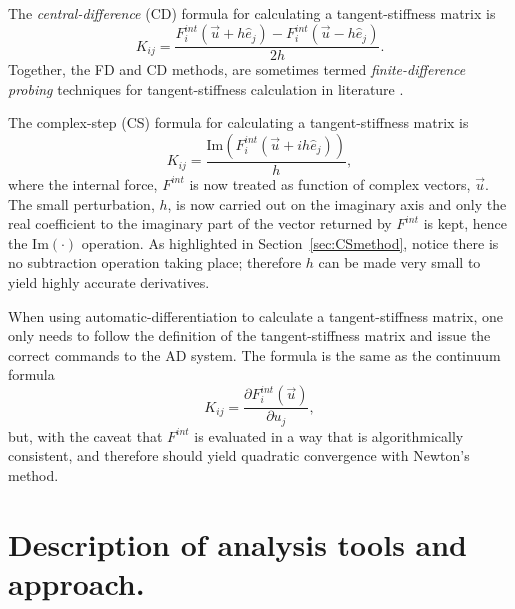 \documentclass[preprint,12pt]{elsarticle}
\begin{document}
The \emph{central-difference} (CD) formula for calculating a tangent-stiffness matrix is
%
\begin{equation} 
  K_{ij} = \frac{F_i^{int}(\vec{u} + h \hat{e}_j) - F_i^{int}(\vec{u} - h \hat{e}_j)}{2 h}.
\end{equation}
%
Together, the FD and CD methods, are sometimes termed \emph{finite-difference probing} techniques for tangent-stiffness calculation in literature \cite{ref-Adaggio}.

The complex-step (CS) formula for calculating a tangent-stiffness matrix is
%
\begin{equation} 
  K_{ij} = \frac{\mbox{Im}(F_i^{int}(\vec{u} + i h \hat{e}_j))}{h},
\end{equation}
%
where the internal force, $F^{int}$ is now treated as function of complex vectors,  $\vec{u}$. The small perturbation, $h$, is now carried out on the imaginary axis and only the real coefficient to the imaginary part of the vector returned by $F^{int}$ is kept, hence the $\mbox{Im}(\cdot)$ operation. As highlighted in Section~\ref{sec:CSmethod}, notice there is no subtraction operation taking place; therefore $h$ can be made very small to yield highly accurate derivatives.

When using automatic-differentiation to calculate a tangent-stiffness matrix, one only needs to follow the definition of the tangent-stiffness matrix and issue the correct commands to the AD system. The formula is the same as the continuum formula
%
\begin{equation} 
  K_{ij} = \frac{\partial F_i^{int}(\vec{u})}{\partial u_j},
\end{equation}
%
but, with the caveat that $F^{int}$ is evaluated in a way that is algorithmically consistent, and therefore should yield quadratic convergence with Newton's method.

\section{Description of analysis tools and approach.} 
%
\end{document}
